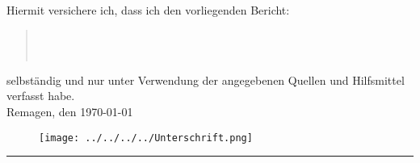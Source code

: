 Hiermit versichere ich, dass ich den vorliegenden Bericht:
\begin{quote}
\textit{\titel} \\ 
\textit{\untertitel} \\
\end{quote}
selbständig und nur unter Verwendung der angegebenen Quellen und Hilfsmittel verfasst habe.\\
Remagen, den \today
\begin{figure}[hp]
	\texttt{[image: ../../../../Unterschrift.png]}
\end{figure}

\rule[1cm]{5cm}{0.5pt}\\
\textsc{\autor} 
